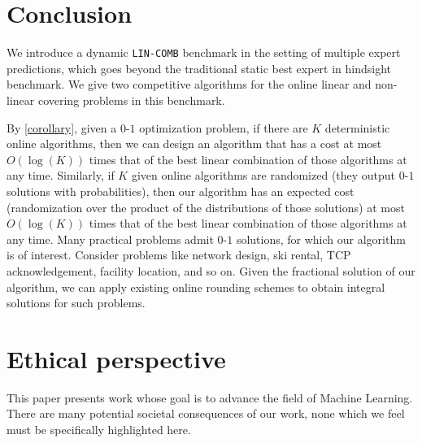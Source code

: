 
\section{Conclusion} \label{sec:conclusion}

We introduce a dynamic \texttt{LIN-COMB} benchmark in the setting of multiple expert predictions, which goes beyond the traditional static best expert in hindsight benchmark. We give two competitive algorithms for the online linear and non-linear covering problems in this benchmark.

By \cref{corollary}, given a $0$-$1$ optimization problem, if there are $K$ deterministic online algorithms, then
we can design an algorithm that has a cost at most $O(\log (K))$ times that of the best linear combination of those algorithms at any time.
Similarly, if $K$ given online algorithms are randomized (they output $0$-$1$ solutions with probabilities), then our algorithm
has an expected cost (randomization over the product of the distributions of those solutions) at most $O(\log(K))$ times that of
the best linear combination of those algorithms at any time. Many practical problems admit $0$-$1$ solutions, for which our algorithm is of interest.
Consider problems like network design, ski rental, TCP acknowledgement, facility location, and so on. Given the fractional solution of our algorithm,
we can apply existing online rounding schemes to obtain integral solutions for such problems.


\section{Ethical perspective}

This paper presents work whose goal is to advance the field of Machine Learning. There are many potential societal consequences of our work, none which we feel must be specifically highlighted here.
